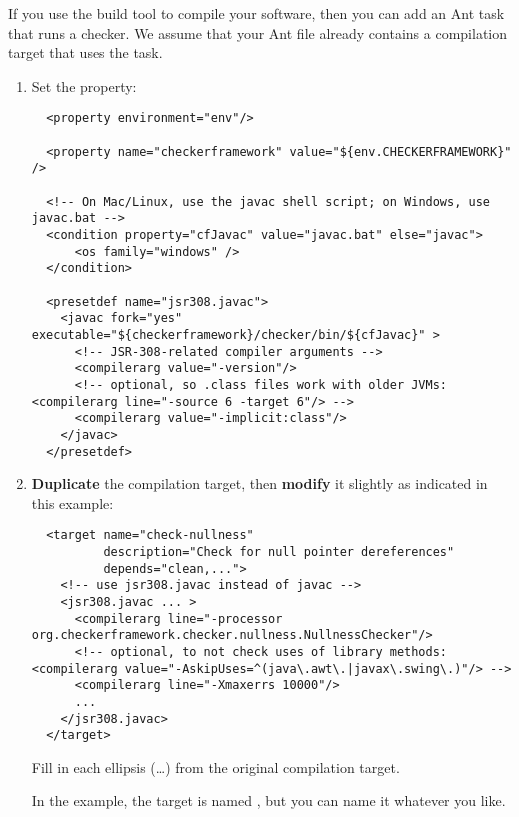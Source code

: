 If you use the  build tool to compile
your software, then you can add an Ant task that runs a checker.  We assume
that your Ant file already contains a compilation target that uses the
 task.

\begin{enumerate}
\item
Set the  property:

\begin{smaller}
\begin{Verbatim}
  <property environment="env"/>

  <property name="checkerframework" value="${env.CHECKERFRAMEWORK}" />
  
  <!-- On Mac/Linux, use the javac shell script; on Windows, use javac.bat -->
  <condition property="cfJavac" value="javac.bat" else="javac">
      <os family="windows" />
  </condition>

  <presetdef name="jsr308.javac">
    <javac fork="yes" executable="${checkerframework}/checker/bin/${cfJavac}" >
      <!-- JSR-308-related compiler arguments -->
      <compilerarg value="-version"/>
      <!-- optional, so .class files work with older JVMs: <compilerarg line="-source 6 -target 6"/> -->
      <compilerarg value="-implicit:class"/>
    </javac>
  </presetdef>
\end{Verbatim}
\end{smaller}

\item \textbf{Duplicate} the compilation target, then \textbf{modify} it slightly as
indicated in this example:

\begin{smaller}
\begin{Verbatim}
  <target name="check-nullness"
          description="Check for null pointer dereferences"
          depends="clean,...">
    <!-- use jsr308.javac instead of javac -->
    <jsr308.javac ... >
      <compilerarg line="-processor org.checkerframework.checker.nullness.NullnessChecker"/>
      <!-- optional, to not check uses of library methods: <compilerarg value="-AskipUses=^(java\.awt\.|javax\.swing\.)"/> -->
      <compilerarg line="-Xmaxerrs 10000"/>
      ...
    </jsr308.javac>
  </target>
\end{Verbatim}
\end{smaller}

Fill in each ellipsis (\ldots) from the original compilation target.

In the example, the target is named , but you can
name it whatever you like.
\end{enumerate}

